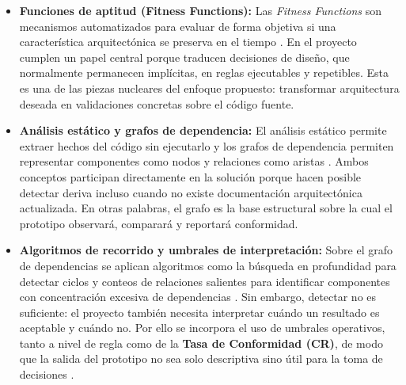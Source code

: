 \begin{itemize}
    \item \textbf{Funciones de aptitud (Fitness Functions):} Las \textit{Fitness Functions} son mecanismos automatizados para evaluar de forma objetiva si una característica arquitectónica se preserva en el tiempo \parencite{FitnessF}. En el proyecto cumplen un papel central porque traducen decisiones de diseño, que normalmente permanecen implícitas, en reglas ejecutables y repetibles. Esta es una de las piezas nucleares del enfoque propuesto: transformar arquitectura deseada en validaciones concretas sobre el código fuente.

    \item \textbf{Análisis estático y grafos de dependencia:} El análisis estático permite extraer hechos del código sin ejecutarlo y los grafos de dependencia permiten representar componentes como nodos y relaciones como aristas \parencite{Pigazzini2021, Klein2022}. Ambos conceptos participan directamente en la solución porque hacen posible detectar deriva incluso cuando no existe documentación arquitectónica actualizada. En otras palabras, el grafo es la base estructural sobre la cual el prototipo observará, comparará y reportará conformidad.

    \item \textbf{Algoritmos de recorrido y umbrales de interpretación:} Sobre el grafo de dependencias se aplican algoritmos como la búsqueda en profundidad para detectar ciclos y conteos de relaciones salientes para identificar componentes con concentración excesiva de dependencias \parencite{Sas2019}. Sin embargo, detectar no es suficiente: el proyecto también necesita interpretar cuándo un resultado es aceptable y cuándo no. Por ello se incorpora el uso de umbrales operativos, tanto a nivel de regla como de la \textbf{Tasa de Conformidad (CR)}, de modo que la salida del prototipo no sea solo descriptiva sino útil para la toma de decisiones \parencite{Murphy2001, Klein2022}.
\end{itemize}


